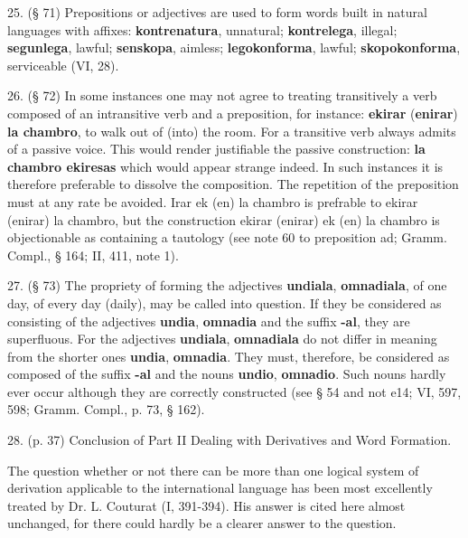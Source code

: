 25. (§ 71) Prepositions or adjectives are used to form words built in natural languages with affixes: \textbf{kontrenatura}, unnatural; \textbf{kontrelega}, illegal; \textbf{segunlega}, lawful; \textbf{senskopa}, aimless; \textbf{legokonforma}, lawful; \textbf{skopokonforma}, serviceable (VI, 28).  %

26. (§ 72) In some instances one may not agree to treating transitively a verb composed of an intransitive verb and a preposition, for instance: \textbf{ekirar }(\textbf{enirar})\textbf{ la chambro}, to walk out of (into) the room. For a transitive verb always admits of a passive voice. This would render justifiable the passive construction: \textbf{la chambro ekiresas} which would appear strange indeed. In such instances it is therefore preferable to dissolve the composition. The repetition of the preposition must at any rate be avoided. Irar ek (en) la chambro is prefrable to ekirar (enirar) la chambro, but the construction ekirar (enirar) ek (en) la chambro is objectionable as containing a tautology (see note 60 to preposition ad; Gramm. Compl., § 164; II, 411, note 1).  %

27. (§ 73) The propriety of forming the adjectives \textbf{undiala}, \textbf{omnadiala}, of one day, of every day (daily), may be called into question. If they be considered as consisting of the adjectives \textbf{undia}, \textbf{omnadia} and the suffix \textbf{-al}, they are superfluous. For the adjectives \textbf{undiala}, \textbf{omnadiala} do not differ in meaning from the shorter ones \textbf{undia}, \textbf{omnadia}. They must, therefore, be considered as composed of the suffix \textbf{-al} and the nouns \textbf{undio}, \textbf{omnadio}. Such nouns hardly ever occur although they are correctly constructed (see § 54 and not e14; VI, 597, 598; Gramm. Compl., p. 73, § 162). %

28. (p. 37) Conclusion of Part II Dealing with Derivatives and Word Formation. %

The question whether or not there can be more than one logical system of derivation applicable to the international language has been most excellently treated by Dr. L. Couturat (I, 391-394). His answer is cited here almost unchanged, for there could hardly be a clearer answer to the question.

